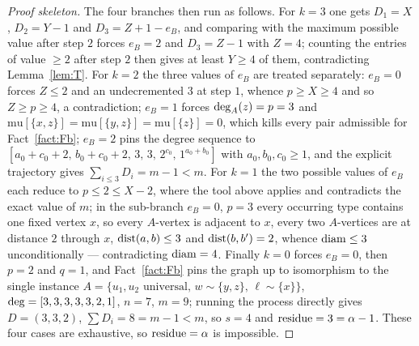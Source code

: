 \begin{proof}[Proof skeleton]
The four branches then run as follows. For $k = 3$ one gets $D_1 = X$, $D_2 = Y - 1$ and
$D_3 = Z + 1 - e_B$, and comparing with the maximum possible value after step $2$ forces
$e_B = 2$ and $D_3 = Z-1$ with $Z = 4$; counting the entries of value $\ge 2$ after step $2$
then gives at least $Y \ge 4$ of them, contradicting Lemma~\ref{lem:T}. For $k = 2$ the
three values of $e_B$ are treated separately: $e_B = 0$ forces $Z \le 2$ and an undecremented
$3$ at step $1$, whence $p \ge X \ge 4$ and so $Z \ge p \ge 4$, a contradiction;
$e_B = 1$ forces $\mathrm{deg}_A(z) = p = 3$ and $\mathrm{mu}[\{x,z\}] = \mathrm{mu}[\{y,z\}] =
\mathrm{mu}[\{z\}] = 0$, which kills every pair admissible for Fact~\ref{fact:Fb};
$e_B = 2$ pins the degree sequence to
$[a_0+c_0+2,\, b_0+c_0+2,\, 3,\, 3,\, 2^{c_0},\, 1^{a_0+b_0}]$ with $a_0, b_0, c_0 \ge 1$,
and the explicit trajectory gives $\sum_{i\le3} D_i = m - 1 < m$. For $k = 1$ the two
possible values of $e_B$ each reduce to $p \le 2 \le X - 2$, where the tool above applies
and contradicts the exact value of $m$; in the sub-branch $e_B = 0$, $p = 3$ every occurring
type contains one fixed vertex $x$, so every $A$-vertex is adjacent to $x$, every two
$A$-vertices are at distance $2$ through $x$, $\operatorname{dist}(a,b) \le 3$ and $\operatorname{dist}(b,b') = 2$,
whence $\operatorname{diam} \le 3$ unconditionally --- contradicting $\operatorname{diam} = 4$. Finally $k = 0$ forces
$e_B = 0$, then $p = 2$ and $q = 1$, and Fact~\ref{fact:Fb} pins the graph up to isomorphism
to the single instance $A = \{u_1,u_2 \text{ universal},\, w \sim \{y,z\},\, \ell \sim
\{x\}\}$, $\mathrm{deg} = [3,3,3,3,3,2,1]$, $n = 7$, $m = 9$; running the process directly gives
$D = (3,3,2)$, $\sum D_i = 8 = m-1 < m$, so $s = 4$ and $\operatorname{residue} = 3 = \alpha - 1$. These
four cases are exhaustive, so $\operatorname{residue} = \alpha$ is impossible.
\end{proof}

